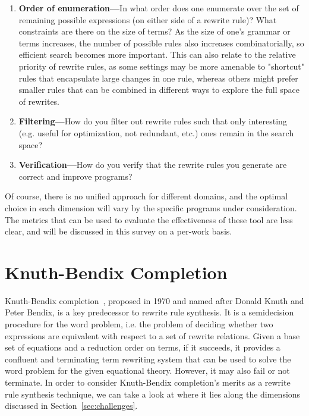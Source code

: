 \documentclass[acmsmall,screen,nonacm]{acmart}
\begin{document}
\begin{enumerate}
    \item \textbf{Order of enumeration---}In what order does one enumerate over the set of remaining possible expressions (on either side of a rewrite rule)? What constraints are there on the size of terms? As the size of one's grammar or terms increases, the number of possible rules also increases combinatorially, so efficient search becomes more important. This can also relate to the relative priority of rewrite rules, as some settings may be more amenable to "shortcut" rules that encapsulate large changes in one rule, whereas others might prefer smaller rules that can be combined in different ways to explore the full space of rewrites.
    \item \textbf{Filtering---}How do you filter out rewrite rules such that only interesting (e.g. useful for optimization, not redundant, etc.) ones remain in the search space?
    \item \textbf{Verification---}How do you verify that the rewrite rules you generate are correct and improve programs?
\end{enumerate}

Of course, there is no unified approach for different domains, and the optimal choice in each dimension will vary by the specific programs under consideration. The metrics that can be used to evaluate the effectiveness of these tool are less clear, and will be discussed in this survey on a per-work basis.




\section{Knuth-Bendix Completion}
Knuth-Bendix completion~\cite{knuth1970completion}, proposed in 1970 and named after Donald Knuth and Peter Bendix, is a key predecessor to rewrite rule synthesis. It is a semidecision procedure for the word problem, i.e. the problem of deciding whether two expressions are equivalent with respect to a set of rewrite relations. Given a base set of equations and a reduction order on terms, if it succeeds, it provides a confluent and terminating term rewriting system that can be used to solve the word problem for the given equational theory. However, it may also fail or not terminate. In order to consider Knuth-Bendix completion's merits as a rewrite rule synthesis technique, we can take a look at where it lies along the dimensions discussed in Section~\ref{sec:challenges}.
\end{document}
